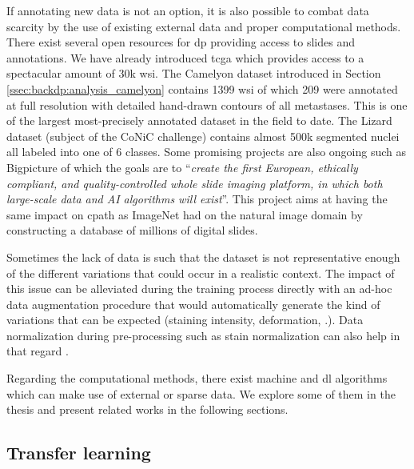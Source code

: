 If annotating new data is not an option, it is also possible to combat data scarcity by the use of existing external data and proper computational methods. There exist several open resources for \acrlong{dp} \cite{maree2019open} providing access to slides and annotations. We have already introduced \acrshort{tcga} which provides access to a spectacular amount of 30k \acrshort{wsi}. The Camelyon dataset introduced in Section \ref{ssec:backdp:analysis_camelyon} contains 1399 \acrshort{wsi} of which 209 were annotated at full resolution with detailed hand-drawn contours of all metastases. This is one of the largest most-precisely annotated dataset in the field to date. The Lizard dataset (subject of the CoNiC challenge) contains almost 500k segmented nuclei all labeled into one of 6 classes. Some promising projects are also ongoing such as Bigpicture \cite{moulin2021imi} of which the goals are to ``\textit{create the first European, ethically compliant, and quality-controlled whole slide imaging platform, in which both large-scale data and AI algorithms will exist}''. This project aims at having the same impact on \acrlong{cpath} as ImageNet had on the natural image domain by constructing a database of millions of digital slides.

Sometimes the lack of data is such that the dataset is not representative enough of the different variations that could occur in a realistic context. The impact of this issue can be alleviated during the training process directly with an ad-hoc data augmentation procedure that would automatically generate the kind of variations that can be expected (\eg staining intensity, deformation, \etc.). Data normalization during pre-processing such as stain normalization can also help in that regard \cite{kang2021stainnet, runz2021normalization}.

Regarding the computational methods, there exist machine and \acrlong{dl} algorithms which can make use of external or sparse data. We explore some of them in the thesis and present related works in the following sections. 

\subsection{Transfer learning}
\label{ssec:backdp:tl}

